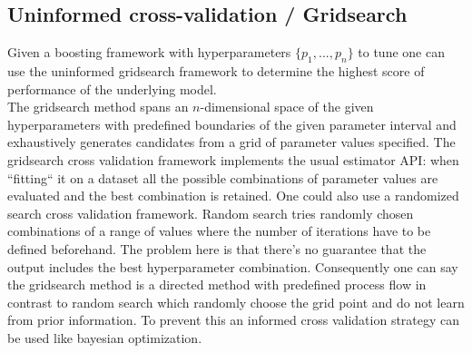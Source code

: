 \documentclass[12pt, a4paper]{article}
\begin{document}
\subsection{Uninformed cross-validation / Gridsearch}
Given a boosting framework with hyperparameters $\{p_1,...,p_n\}$ to tune one can use the uninformed gridsearch framework to determine the highest score of performance of the underlying model. \\
The gridsearch method spans an $n$-dimensional space of the given hyperparameters with predefined boundaries of the given parameter interval and exhaustively generates candidates from a grid of parameter values specified.
The gridsearch cross validation framework implements the usual estimator API: when ``fitting`` it on a dataset all the possible combinations of parameter values are evaluated and the best combination is retained.
One could also use a randomized search cross validation framework. Random search tries randomly chosen combinations of a range of values where the number of iterations have to be defined beforehand. The problem here is that there's no guarantee that the output includes the best hyperparameter combination. Consequently one can say the gridsearch method is a directed method with predefined process flow in contrast to random search which randomly choose the grid point and do not learn from prior information. To prevent this an informed cross validation strategy can be used like bayesian optimization.
\end{document}
